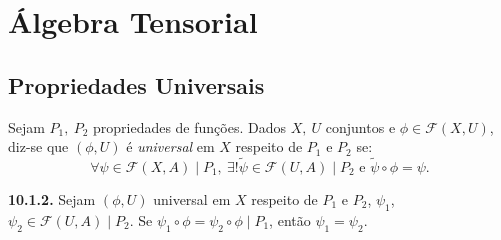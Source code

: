 \section{Álgebra Tensorial}

\subsection{Propriedades Universais}

\begin{definition}
    Sejam \(P_1, \ P_2\) propriedades de funções. Dados \(X, \ U\) conjuntos e \(\phi \in \mathcal{F}(X,U)\), diz-se que \((\phi, U)\) é \emph{universal} em \(X\) respeito de \(P_1\) e \(P_2\) se: 
    \[ \forall \psi \in \mathcal{F}(X,A ) \mid  P_1, \ \exists ! \widetilde{\psi} \in \mathcal{F}(U, A )\mid  P_2 \text{ e } \widetilde{\psi} \circ \phi = \psi. \]  
\end{definition}

\hypertarget{lemma1012}{}
\begin{lemma}
    \textbf{10.1.2.} Sejam \((\phi, U)\) universal em \(X\) respeito de \(P_1\) e \(P_2\), \(\psi_1\), \(\psi_2 \in \mathcal{F}(U,A) \mid P_2\). Se \(\psi_1 \circ \phi = \psi_2 \circ \phi \mid P_1\), então \(\psi_1 = \psi_2\).    
\end{lemma}


